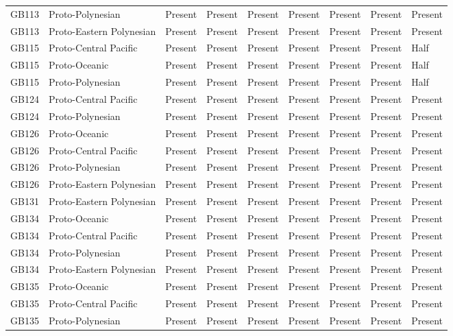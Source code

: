 \begin{longtable}{p{1.5cm}p{2.5cm}p{2.5cm}p{2.5cm}p{2.5cm}p{2.5cm}p{2.5cm}p{2.5cm}p{2.5cm}}
  GB113 & Proto-Polynesian & Present & Present & Present & Present & Present & Present & Present \\ 
  GB113 & Proto-Eastern Polynesian & Present & Present & Present & Present & Present & Present & Present \\ 
  GB115 & Proto-Central Pacific & Present & Present & Present & Present & Present & Present & Half \\ 
  GB115 & Proto-Oceanic & Present & Present & Present & Present & Present & Present & Half \\ 
  GB115 & Proto-Polynesian & Present & Present & Present & Present & Present & Present & Half \\ 
  GB124 & Proto-Central Pacific & Present & Present & Present & Present & Present & Present & Present \\ 
  GB124 & Proto-Polynesian & Present & Present & Present & Present & Present & Present & Present \\ 
  GB126 & Proto-Oceanic & Present & Present & Present & Present & Present & Present & Present \\ 
  GB126 & Proto-Central Pacific & Present & Present & Present & Present & Present & Present & Present \\ 
  GB126 & Proto-Polynesian & Present & Present & Present & Present & Present & Present & Present \\ 
  GB126 & Proto-Eastern Polynesian & Present & Present & Present & Present & Present & Present & Present \\ 
  GB131 & Proto-Eastern Polynesian & Present & Present & Present & Present & Present & Present & Present \\ 
  GB134 & Proto-Oceanic & Present & Present & Present & Present & Present & Present & Present \\ 
  GB134 & Proto-Central Pacific & Present & Present & Present & Present & Present & Present & Present \\ 
  GB134 & Proto-Polynesian & Present & Present & Present & Present & Present & Present & Present \\ 
  GB134 & Proto-Eastern Polynesian & Present & Present & Present & Present & Present & Present & Present \\ 
  GB135 & Proto-Oceanic & Present & Present & Present & Present & Present & Present & Present \\ 
  GB135 & Proto-Central Pacific & Present & Present & Present & Present & Present & Present & Present \\ 
  GB135 & Proto-Polynesian & Present & Present & Present & Present & Present & Present & Present \\ 

\end{longtable}
